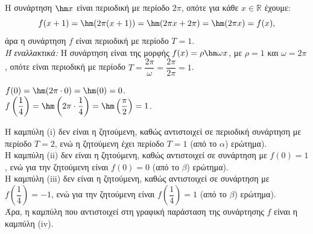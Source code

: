 \begin{alist}
\item Η συνάρτηση $\hm  x$ είναι περιοδική με περίοδο $2\pi$, οπότε για κάθε $x \in \mathbb{R}$ έχουμε:
\[f(x + 1) = \hm (2\pi(x + 1)) = \hm (2\pi x + 2\pi) = \hm (2\pi x) = f(x),\]
άρα η συνάρτηση $f$ είναι περιοδική με περίοδο $T = 1$. \\
\textit{Ή εναλλακτικά:} Η συνάρτηση είναι της μορφής $f(x) = \rho\hm \omega x$, με $\rho = 1$ και $\omega = 2\pi$, οπότε είναι περιοδική με περίοδο $T = \dfrac{2\pi}{\omega} = \dfrac{2\pi}{2\pi} = 1$.
\item $f(0) = \hm (2\pi \cdot 0) = \hm (0) = 0$. \\
$f\left(\dfrac{1}{4}\right) = \hm \left(2\pi \cdot \dfrac{1}{4}\right) = \hm \left(\dfrac{\pi}{2}\right) = 1$.
\item Η καμπύλη (i) δεν είναι η ζητούμενη, καθώς αντιστοιχεί σε περιοδική συνάρτηση με περίοδο $T = 2$, ενώ η ζητούμενη έχει περίοδο $T = 1$ (από το $\alpha$) ερώτημα). \\
Η καμπύλη (ii) δεν είναι η ζητούμενη, καθώς αντιστοιχεί σε συνάρτηση με $f(0) = 1$, ενώ για την ζητούμενη είναι $f(0) = 0$ (από το $\beta$) ερώτημα). \\
Η καμπύλη (iii) δεν είναι η ζητούμενη, καθώς αντιστοιχεί σε συνάρτηση με $f\left(\dfrac{1}{4}\right) = -1$, ενώ για την ζητούμενη είναι $f\left(\dfrac{1}{4}\right) = 1$ (από το $\beta$) ερώτημα). \\
Άρα, η καμπύλη που αντιστοιχεί στη γραφική παράσταση της συνάρτησης $f$ είναι η καμπύλη (iv).
\end{alist}

